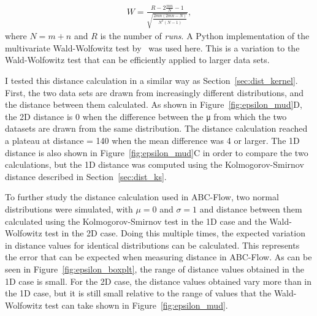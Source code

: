 \begin{align}
W = \frac{R - 2\frac{mn}{N}-1}{\sqrt{\frac{2mn(2mn-N)}{N^2(N-1)}}},
\end{align}
where $N = m + n$ and $R$ is the number of \textit{runs}. A Python implementation of the multivariate Wald-Wolfowitz test by~\textcite{Monaco:2014wx} was used here. This is a variation to the Wald-Wolfowitz test that can be efficiently applied to larger data sets. 


I tested this distance calculation in a similar way as Section~\ref{sec:dist_kernel}. First, the two data sets are drawn from increasingly different distributions, and the distance between them calculated. As shown in Figure~\ref{fig:epsilon_mud}D, the 2D distance is 0 when the difference between the μ from which the two datasets are drawn from the same distribution. The distance calculation reached a plateau at distance = 140 when the mean difference was 4 or larger. The 1D distance is also shown in Figure~\ref{fig:epsilon_mud}C in order to compare the two calculations, but the 1D distance was computed using the Kolmogorov-Smirnov distance described in Section~\ref{sec:dist_ks}.

To further study the distance calculation used in ABC-Flow, two normal distributions were simulated, with $\mu=0$ and $\sigma=1$ and distance between them calculated using the Kolmogorov-Smirnov test in the 1D case and the Wald-Wolfowitz test in the 2D case. Doing this multiple times, the expected variation in distance values for identical distributions can be calculated. This represents the error that can be expected when measuring distance in ABC-Flow. As can be seen in Figure~\ref{fig:epsilon_boxplt}, the range of distance values obtained in the 1D case is small. For the 2D case, the distance values obtained vary more than in the 1D case, but it is still small relative to the range of values that the Wald-Wolfowitz test can take shown in Figure~\ref{fig:epsilon_mud}. 

